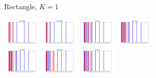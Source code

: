\documentclass{article}
\numberwithin{equation}{section}
\theoremstyle{definition}
\begin{document}
\begin{figure}[ht]
\begin{subfigure}[t]{\textwidth}
        \caption{Rectangle, $K=1$}
    \end{subfigure}
    \begin{subfigure}[t]{\textwidth}
        \centering
        \includegraphics[width=0.2\textwidth]{images/line_line_2_0.06_eigenvector_division.png}
        \includegraphics[width=0.2\textwidth]{images/line_line_2_0.08_eigenvector_division.png}
        \includegraphics[width=0.2\textwidth]{images/line_line_2_0.1_eigenvector_division.png}
        \includegraphics[width=0.2\textwidth]{images/line_line_2_0.12_eigenvector_division.png}
        \includegraphics[width=0.2\textwidth]{images/line_line_2_0.15_eigenvector_division.png}
        \includegraphics[width=0.2\textwidth]{images/line_line_2_0.18_eigenvector_division.png}
        \includegraphics[width=0.2\textwidth]{images/line_line_2_0.2_eigenvector_division.png}

\end{subfigure}
\end{figure}
\end{document}
